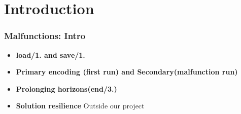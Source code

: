 \section{Introduction}

\begin{frame}
	\frametitle{Malfunctions: Intro}
		\begin{itemize}
		\item \textbf{load/1. and save/1.} 
		\item \textbf{Primary encoding (first run) and Secondary(malfunction run)}
		\item \textbf{Prolonging horizons(end/3.)}		
		\item \textbf{Solution resilience}	 Outside our project
	\end{itemize}
	
\end{frame}

